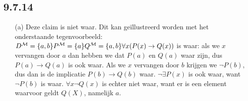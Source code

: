     

\subsection*{9.7.14}
\begin{enumerate}
    \item[(a)] Deze claim is niet waar. Dit kan geïllustreerd worden met het onderstaande tegenvoorbeeld:\\
    $ D^\mathcal{M} = \{a,b\} \\
    P^\mathcal{M} = \{a\} \\
    Q^\mathcal{M} = \{a,b\}
    \\ \forall x (P(x)\rightarrow Q(x))$ is waar: als we $x$ vervangen door $a$ dan hebben we dat $P(a)$ en $Q(a)$ waar zijn, dus $P(a)\rightarrow Q(a)$ is ook waar. Als we $x$ vervangen door $b$ krijgen we $\neg P(b)$, dus dan is de implicatie $P(b)\rightarrow Q(b)$ waar. $\neg \exists P(x)$ is ook waar, want $\neg P(b)$ is waar. $\forall x \neg Q(x)$ is echter niet waar, want er is een element waarvoor geldt $Q(X)$, namelijk $a$. 
\end{enumerate}
	
